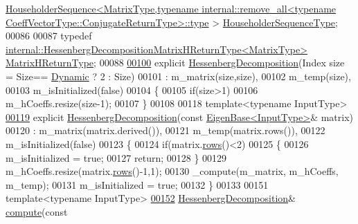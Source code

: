 \begin{DoxyCode}
      \hyperlink{group___householder___module_class_eigen_1_1_householder_sequence}{HouseholderSequence<MatrixType,typename internal::remove\_all<typename
       CoeffVectorType::ConjugateReturnType>::type}
      > \hyperlink{group___eigenvalues___module_a7c1188cd5d8f550c8941df75a50a7d08}{HouseholderSequenceType};
00086     
00087     \textcolor{keyword}{typedef} \hyperlink{group___eigenvalues___module_struct_eigen_1_1internal_1_1_hessenberg_decomposition_matrix_h_return_type}{internal::HessenbergDecompositionMatrixHReturnType<MatrixType>}
       \hyperlink{group___eigenvalues___module_struct_eigen_1_1internal_1_1_hessenberg_decomposition_matrix_h_return_type}{MatrixHReturnType};
00088 
\hyperlink{group___eigenvalues___module_aee1724cb6418ede1a8b9045036a5a319}{00100}     \textcolor{keyword}{explicit} \hyperlink{group___eigenvalues___module_aee1724cb6418ede1a8b9045036a5a319}{HessenbergDecomposition}(Index size = Size==
      \hyperlink{namespace_eigen_ad81fa7195215a0ce30017dfac309f0b2}{Dynamic} ? 2 : Size)
00101       : m\_matrix(size,size),
00102         m\_temp(size),
00103         m\_isInitialized(false)
00104     \{
00105       \textcolor{keywordflow}{if}(size>1)
00106         m\_hCoeffs.resize(size-1);
00107     \}
00108 
00118     \textcolor{keyword}{template}<\textcolor{keyword}{typename} InputType>
\hyperlink{group___eigenvalues___module_acd22602a3e3e5a02f79990ba1e445dc9}{00119}     \textcolor{keyword}{explicit} \hyperlink{group___eigenvalues___module_acd22602a3e3e5a02f79990ba1e445dc9}{HessenbergDecomposition}(\textcolor{keyword}{const} 
      \hyperlink{group___core___module_struct_eigen_1_1_eigen_base}{EigenBase<InputType>}& matrix)
00120       : m\_matrix(matrix.derived()),
00121         m\_temp(matrix.rows()),
00122         m\_isInitialized(false)
00123     \{
00124       \textcolor{keywordflow}{if}(matrix.\hyperlink{group___core___module_a8141320ba8df384426c298b32b000d8e}{rows}()<2)
00125       \{
00126         m\_isInitialized = \textcolor{keyword}{true};
00127         \textcolor{keywordflow}{return};
00128       \}
00129       m\_hCoeffs.resize(matrix.\hyperlink{group___core___module_a8141320ba8df384426c298b32b000d8e}{rows}()-1,1);
00130       \_compute(m\_matrix, m\_hCoeffs, m\_temp);
00131       m\_isInitialized = \textcolor{keyword}{true};
00132     \}
00133 
00151     \textcolor{keyword}{template}<\textcolor{keyword}{typename} InputType>
\hyperlink{group___eigenvalues___module_a239a6fd42c57aab3c0b048c47fde3004}{00152}     \hyperlink{group___eigenvalues___module_class_eigen_1_1_hessenberg_decomposition}{HessenbergDecomposition}& \hyperlink{group___eigenvalues___module_a239a6fd42c57aab3c0b048c47fde3004}{compute}(\textcolor{keyword}{const} 

\end{DoxyCode}
